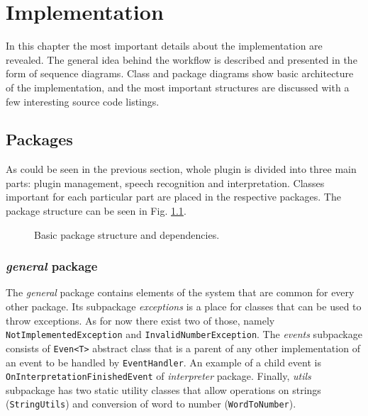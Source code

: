 \chapter{Implementation}
\label{cha:Implementation}

In this chapter the most important details about the implementation are revealed. The general idea behind the workflow is described and presented in the form of sequence diagrams. Class and package diagrams show basic architecture of the implementation, and the most important structures are discussed with a few interesting source code listings.

\section{Packages}
As could be seen in the previous section, whole plugin is divided into three main parts: plugin management, speech recognition and interpretation. Classes important for each particular part are placed in the respective packages. The package structure can be seen in Fig. \ref{fig:packageDiagram}. 

\begin{figure}[hbt!]
    \centering
    \caption{Basic package structure and dependencies.}
    \label{fig:packageDiagram}
\end{figure}

\subsection{\textit{general} package}
The \textit{general} package contains elements of the system that are common for every other package. Its subpackage \textit{exceptions} is a place for classes that can be used to throw exceptions. As for now there exist two of those, namely \texttt{NotImplementedException} and \texttt{InvalidNumberException}. The \textit{events} subpackage consists of \texttt{Even<T>} abstract class that is a parent of any other implementation of an event to be handled by \texttt{EventHandler}. An example of a child event is \texttt{OnInterpretationFinishedEvent} of \textit{interpreter} package. Finally, \textit{utils} subpackage has two static utility classes that allow operations on strings (\texttt{StringUtils}) and conversion of word to number (\texttt{WordToNumber}).


